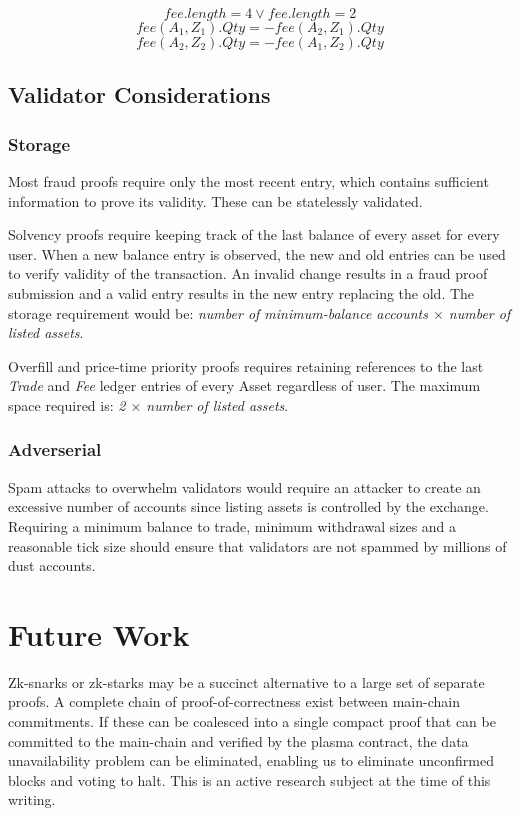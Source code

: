 \documentclass[12pt,a4paper]{article}
\begin{document}
\begin{equation}
    fee.length = 4 \lor fee.length = 2
\end{equation}
\begin{equation}
fee(A_1,Z_1).Qty = -fee(A_2,Z_1).Qty 
\end{equation}
\begin{equation}
fee(A_2,Z_2).Qty = -fee(A_1,Z_2).Qty 
\end{equation}
\subsection{Validator Considerations}

\subsubsection{Storage} 
Most fraud proofs require only the most recent entry, which contains sufficient information to prove its validity. These can be statelessly validated. 

Solvency proofs require keeping track of the last balance of every asset for every user. When a new balance entry is observed, the new and old entries can be used to verify validity of the transaction. An invalid change results in a fraud proof submission and a valid entry results in the new entry replacing the old. The storage requirement would be: \emph{number of minimum-balance accounts $\times$ number of listed assets}.

Overfill and price-time priority proofs requires retaining references to the last \emph{Trade} and \emph{Fee} ledger entries of every Asset regardless of user. The maximum space required is: \emph{2 $\times$ number of listed assets}.

\subsubsection{Adverserial} Spam attacks to overwhelm validators would require an attacker to create an excessive number of accounts since listing assets is controlled by the exchange. Requiring a minimum balance to trade, minimum withdrawal sizes and a reasonable tick size should ensure that validators are not spammed by millions of dust accounts. 

\section*{Future Work}
Zk-snarks or zk-starks may be a succinct alternative to a large set of separate proofs. A complete chain of proof-of-correctness exist between main-chain commitments. If these can be coalesced into a single compact proof that can be committed to the main-chain and verified by the plasma contract, the data unavailability problem can be eliminated, enabling us to eliminate unconfirmed blocks and voting to halt. This is an active research subject at the time of this writing.
\end{document}

